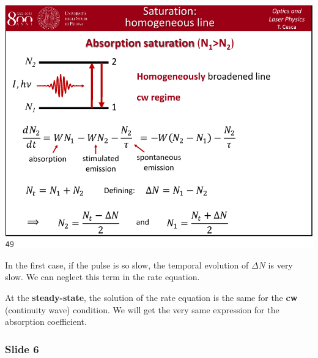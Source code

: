 \documentclass[../main/main.tex]{subfiles}
\begin{document}
\begin{minipage}[]{0.5\linewidth}
\centering
\includegraphics[page=5,width=1\textwidth]{../lessons/pdf_file/10_lecture.pdf}
\end{minipage}
\hspace{0.3cm}\vspace{0.3cm}
\begin{minipage}[c]{0.47\linewidth}

In the first case, if the pulse is so slow, the temporal evolution of \( \Delta N \) is very slow. We can neglect this term in the rate equation.

At the \textbf{steady-state}, the solution of the rate equation is the same for the \textbf{cw} (continuity wave) condition.
We will get the very same expression for the absorption coefficient.

\end{minipage}

\subsubsection*{Slide 6}
\end{document}
